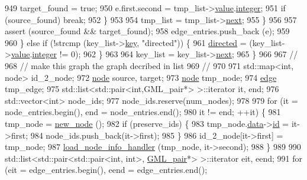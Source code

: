 \begin{DoxyCode}
949             target\_found = \textcolor{keyword}{true};
950             e.first.second = tmp\_list->\mbox{\hyperlink{struct_g_m_l__pair_aef8797e7d2fc0d2e2f628ce9c2783a6c}{value}}.\mbox{\hyperlink{union_g_m_l__pair__val_a701b42178210e3460f15cc34bcd389ff}{integer}};
951             \textcolor{keywordflow}{if} (source\_found) \textcolor{keywordflow}{break};
952         \}
953 
954         tmp\_list = tmp\_list->\mbox{\hyperlink{struct_g_m_l__pair_aef47e6103f05e1411fa55f731972b592}{next}};
955         \}
956 
957         assert (source\_found && target\_found);
958         edge\_entries.push\_back (e);
959 
960     \} \textcolor{keywordflow}{else} \textcolor{keywordflow}{if} (!strcmp (key\_list->\mbox{\hyperlink{struct_g_m_l__pair_a00e5de36c09fef63b8d439b4341f0655}{key}}, \textcolor{stringliteral}{"directed"})) \{        
961         \mbox{\hyperlink{classgraph_ab4120df210eb3d03d20b0bd27f8cbe8c}{directed}} = (key\_list->\mbox{\hyperlink{struct_g_m_l__pair_aef8797e7d2fc0d2e2f628ce9c2783a6c}{value}}.\mbox{\hyperlink{union_g_m_l__pair__val_a701b42178210e3460f15cc34bcd389ff}{integer}} != 0);
962     \}   
963 
964     key\_list = key\_list->\mbox{\hyperlink{struct_g_m_l__pair_aef47e6103f05e1411fa55f731972b592}{next}};
965     \}
966 
967     \textcolor{comment}{//}
968     \textcolor{comment}{// make this graph the graph decribed in list}
969     \textcolor{comment}{//}
970 
971     std::map<int, node> id\_2\_node;
972     \mbox{\hyperlink{classnode}{node}} source, target;
973     \mbox{\hyperlink{classnode}{node}} tmp\_node;
974     \mbox{\hyperlink{classedge}{edge}} tmp\_edge;
975     std::list<std::pair<int,GML\_pair*> >::iterator it, end;
976     std::vector<int> node\_ids;
977     node\_ids.reserve(num\_nodes);
978 
979     \textcolor{keywordflow}{for} (it = node\_entries.begin(), end = node\_entries.end();
980      it != end; ++it) \{
981     tmp\_node = \mbox{\hyperlink{classgraph_ab9505335c20558319b6cce25aed23524}{new\_node}} ();
982     \textcolor{keywordflow}{if} (preserve\_ids) \{
983         tmp\_node.\mbox{\hyperlink{classnode_a4ae3d54ebb61be3a102bedf5b91bef75}{data}}->\mbox{\hyperlink{classnode__data_ac87541ac4470e3c17df808ec9a67f6c4}{id}} = it->first;
984         node\_ids.push\_back(it->first);
985     \}
986     id\_2\_node[it->first] = tmp\_node;    
987     \mbox{\hyperlink{classgraph_ae956c361413410987a54e2296af2572f}{load\_node\_info\_handler}} (tmp\_node, it->second);
988     \}
989 
990     std::list<std::pair<std::pair<int, int>, \mbox{\hyperlink{struct_g_m_l__pair}{GML\_pair}}*> >::iterator eit, eend;
991     \textcolor{keywordflow}{for} (eit = edge\_entries.begin(), eend = edge\_entries.end();

\end{DoxyCode}
